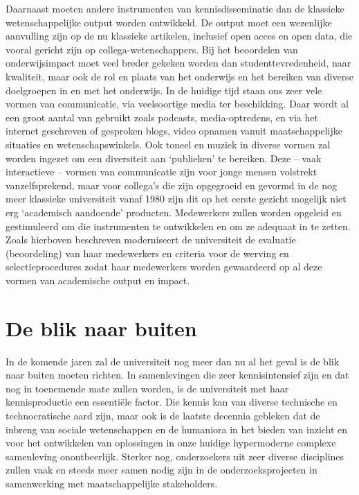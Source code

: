\documentclass[empirical, authordate, ]{new-jote-article}
\begin{document}
	Daarnaast moeten andere instrumenten van kennisdisseminatie dan de klassieke wetenschappelijke output worden ontwikkeld. De output moet een wezenlijke aanvulling zijn op de nu klassieke artikelen, inclusief open acces en open data, die vooral gericht zijn op collega-wetenschappers. Bij het beoordelen van onderwijsimpact moet veel breder gekeken worden dan studenttevredenheid, naar kwaliteit, maar ook de rol en plaats van het onderwijs en het bereiken van diverse doelgroepen in en met het onderwijs. In de huidige tijd staan ons zeer vele vormen van communicatie, via veelsoortige media ter beschikking. Daar wordt al een groot aantal van gebruikt zoals podcasts, media-optredens, en via het internet geschreven of gesproken blogs, video opnamen vanuit maatschappelijke situaties en wetenschapswinkels. Ook toneel en muziek in diverse vormen zal worden ingezet om een diversiteit aan ‘publieken' te bereiken. Deze -- vaak interactieve -- vormen van communicatie zijn voor jonge mensen volstrekt vanzelfsprekend, maar voor collega's die zijn opgegroeid en gevormd in de nog meer klassieke universiteit vanaf 1980 zijn dit op het eerste gezicht mogelijk niet erg ‘academisch aandoende' producten. Medewerkers zullen worden opgeleid en gestimuleerd om die instrumenten te ontwikkelen en om ze adequaat in te zetten. Zoals hierboven beschreven moderniseert de universiteit de evaluatie (beoordeling) van haar medewerkers en criteria voor de werving en selectieprocedures zodat haar medewerkers worden gewaardeerd op al deze vormen van academische output en impact.



	\section{De blik naar buiten}



	In de komende jaren zal de universiteit nog meer dan nu al het geval is de blik naar buiten moeten richten. In samenlevingen die zeer kennisintensief zijn en dat nog in toenemende mate zullen worden, is de universiteit met haar kennisproductie een essentiële factor. Die kennis kan van diverse technische en technocratische aard zijn, maar ook is de laatste decennia gebleken dat de inbreng van sociale wetenschappen en de humaniora in het bieden van inzicht en voor het ontwikkelen van oplossingen in onze huidige hypermoderne complexe samenleving onontbeerlijk. Sterker nog, onderzoekers uit zeer diverse disciplines zullen vaak en steeds meer samen nodig zijn in de onderzoeksprojecten in samenwerking met maatschappelijke stakeholders.
\end{document}
